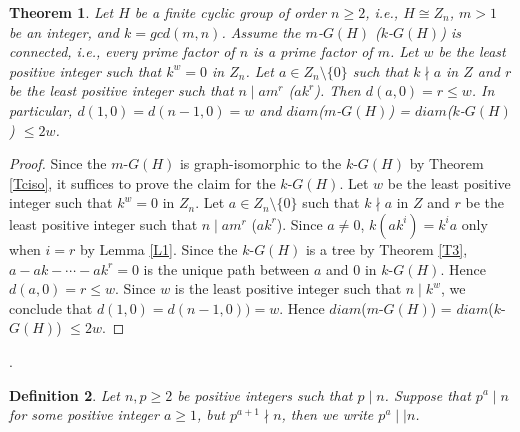 \documentclass{amsart}
\newtheorem{thm}{Theorem}[section]
\theoremstyle{plain}
\newtheorem{defi}[thm]{Definition}
\begin{document}
\begin{thm}\label{D1}
Let $H$ be a finite cyclic group of order $n \geq 2$, i.e., $H \cong Z_n$, $m > 1$ be an integer, and $k = gcd(m, n)$.  Assume the $m$-$G(H)$ ($k$-$G(H)$) is connected, i.e., every prime factor of $n$ is a prime factor of $m$. Let $w$ be the least positive integer such that $k^w = 0$ in $Z_n$. Let $a \in Z_n \setminus \{0\}$ such that $k\nmid a$ in $Z$ and $r$ be the least positive integer such that $n \mid am^r$ ($ak^r$). Then $d(a, 0) = r \leq w$. In particular, $d(1, 0) = d(n-1, 0) = w$ and $diam$($m$-$G(H)$) = $diam$($k$-$G(H)$) $\leq 2w$.
\end{thm}
\begin{proof}
Since the $m$-$G(H)$ is graph-isomorphic to the $k$-$G(H)$ by Theorem \ref{Tciso}, it suffices to prove the claim for the $k$-$G(H)$. Let $w$ be the least positive integer such that $k^w = 0$ in $Z_n$. Let $a \in Z_n \setminus \{0\}$ such that $k\nmid a$ in $Z$ and $r$ be the least positive integer such that $n \mid am^r$ ($ak^r$). Since $a\not = 0$, $k(ak^i) = k^ia$ only when $i = r$ by Lemma \ref{L1}. Since the $k$-$G(H)$ is a tree by Theorem \ref{T3}, $a-ak-  \cdots - ak^r = 0$ is the unique path between $a$ and $0$ in $k$-$G(H)$. Hence $d(a, 0) = r \leq w$. Since $w$ is the least positive integer such that $n \mid k^w$, we conclude that $d(1, 0) = d(n-1,0)) = w$. Hence $diam$($m$-$G(H)$) = $diam$($k$-$G(H)$) $\leq 2w$.
		\end{proof}.
		\begin{defi}
			Let $n, p \geq 2$ be positive integers such that $p \mid n$. Suppose that $p^a \mid n$ for some positive integer $a\geq 1$, but $p^{a+1} \nmid n$, then we write $p^a\mid\mid n$.
		\end{defi}
\end{document}
